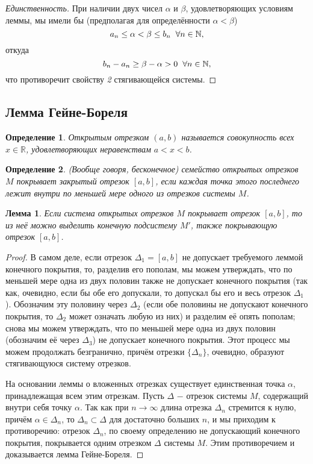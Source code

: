 \documentclass{article}
\newtheorem*{lemma}{Лемма}
\newtheorem{definition}{Определение}[section]
\begin{document}
\begin{proof}[Единственность]
При наличии двух чисел \(\alpha\) и \(\beta\), удовлетворяющих условиям леммы, мы имели бы (предполагая для определённости \(\alpha < \beta\))
\[
a_n \leq \alpha < \beta \leq b_n \hspace{2mm} \forall n \in \mathbb{N},
\]
откуда
\[
b_n - a_n \geq \beta - \alpha > 0 \hspace{2mm} \forall n \in \mathbb{N},
\]
что противоречит свойству \textit{2} стягивающейся системы.
\end{proof}

\subsection{Лемма Гейне-Бореля}

\begin{definition}
Открытым отрезком \((a, b)\) называется совокупность всех \(x \in \mathbb{R}\), удовлетворяющих неравенствам \(a < x < b\).
\end{definition}

\begin{definition}
(Вообще говоря, бесконечное) семейство открытых отрезков \(M\) покрывает закрытый отрезок \([a, b]\), если каждая точка этого последнего лежит внутри по меньшей мере одного из отрезков системы \(M\).
\end{definition}

\begin{lemma}
Если система открытых отрезков \(M\) покрывает отрезок \([a, b]\), то из неё можно выделить конечную подсистему \(M'\), также покрывающую отрезок \([a, b]\).
\end{lemma}

\begin{proof}
В самом деле, если отрезок \(\Delta_1 = [a, b]\) не допускает требуемого леммой конечного покрытия, то, разделив его пополам, мы можем утверждать, что по меньшей мере одна из двух половин также не допускает конечного покрытия (так как, очевидно, если бы обе его допускали, то допускал бы его и весь отрезок \(\Delta_1\)). Обозначим эту половину через \(\Delta_2\) (если обе половины не допускают конечного покрытия, то \(\Delta_2\) может означать любую из них) и разделим её опять пополам; снова мы можем утверждать, что по меньшей мере одна из двух половин (обозначим её через \(\Delta_3\)) не допускает конечного покрытия. Этот процесс мы можем продолжать безгранично, причём отрезки \(\{\Delta_n\}\), очевидно, образуют стягивающуюся систему отрезков.

На основании леммы о вложенных отрезках существует единственная точка \(\alpha\), принадлежащая всем этим отрезкам. Пусть \(\Delta\) \(-\) отрезок системы \(M\), содержащий внутри себя точку \(\alpha\). Так как при \(n \to \infty\) длина отрезка \(\Delta_n\) стремится к нулю, причём \(\alpha \in \Delta_n\), то \(\Delta_n \subset \Delta\) для достаточно больших \(n\), и мы приходим к противоречию: отрезок \(\Delta_n\), по своему определению не допускающий конечного покрытия, покрывается одним отрезком \(\Delta\) системы \(M\). Этим противоречием и доказывается лемма Гейне-Бореля.
\end{proof}
\end{document}
